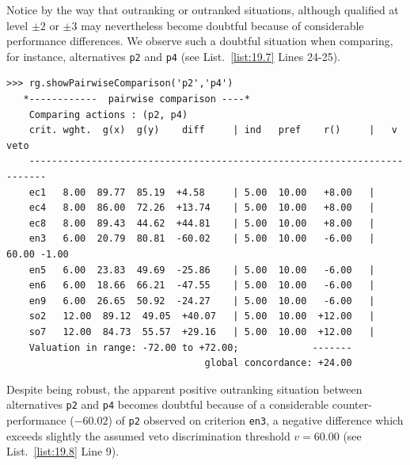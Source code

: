Notice by the way that outranking or outranked situations, although qualified at level $\pm 2$ or $\pm 3$ may nevertheless become doubtful because of considerable performance differences. We observe such a doubtful situation when comparing, for instance, alternatives \texttt{p2} and \texttt{p4} (see List.~\vref{list:19.7} Lines 24-25).
\begin{lstlisting}[caption={Comparing alternatives \texttt{p2} and \texttt{p4}},label=list:19.8,basicstyle=\ttfamily\scriptsize]
>>> rg.showPairwiseComparison('p2','p4')
   *------------  pairwise comparison ----*
    Comparing actions : (p2, p4)
    crit. wght.  g(x)  g(y)    diff  	| ind   pref    r() 	|   v    veto
    -------------------------------------------------------------------------
    ec1   8.00  89.77  85.19  +4.58 	| 5.00  10.00   +8.00 	| 
    ec4   8.00  86.00  72.26  +13.74 	| 5.00  10.00   +8.00 	| 
    ec8   8.00  89.43  44.62  +44.81 	| 5.00  10.00   +8.00 	| 
    en3   6.00  20.79  80.81  -60.02 	| 5.00  10.00   -6.00 	| 60.00 -1.00
    en5   6.00  23.83  49.69  -25.86 	| 5.00  10.00   -6.00 	| 
    en6   6.00  18.66  66.21  -47.55 	| 5.00  10.00   -6.00 	| 
    en9   6.00  26.65  50.92  -24.27 	| 5.00  10.00   -6.00 	| 
    so2   12.00  89.12  49.05  +40.07 	| 5.00  10.00  +12.00 	| 
    so7   12.00  84.73  55.57  +29.16 	| 5.00  10.00  +12.00   |
    Valuation in range: -72.00 to +72.00;             -------
                                   global concordance: +24.00      
\end{lstlisting}

Despite being robust, the apparent positive outranking situation between alternatives \texttt{p2} and \texttt{p4} becomes doubtful because of a considerable counter-performance ($-60.02$) of \texttt{p2} observed on criterion \texttt{en3}, a negative difference which exceeds slightly the assumed veto discrimination threshold $v = 60.00$ (see List.~\vref{list:19.8} Line 9).

